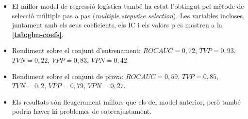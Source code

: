 \documentclass[CAT]{TFUOC}%
\begin{document}
\begin{itemize}
\item
  El millor model de regressió logística també ha estat l'obtingut pel mètode de selecció múltiple pas a pas (\emph{multiple stepwise selection}). Les variables incloses, juntament amb els seus coeficients, els IC i els valors p es mostren a la \textbf{\autoref{tab:glm-coefs}}.
\item
  Rendiment sobre el conjunt d'entrenament: \(ROC AUC = 0,72\), \(TVP = 0,93\), \(TVN = 0,22\), \(VPP = 0,83\), \(VPN = 0,42\).
\item
  Rendiment sobre el conjunt de prova: \(ROC AUC = 0,59\), \(TVP = 0,85\), \(TVN = 0,2\), \(VPP = 0,79\), \(VPN = 0,27\).
\item
  Els resultats són lleugerament millors que els del model anterior, però també podria haver-hi problemes de sobreajustament.
\end{itemize}
\end{document}
